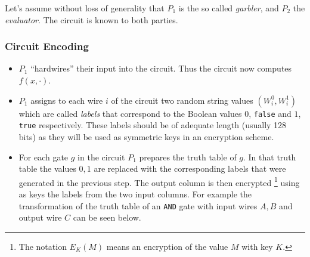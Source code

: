 Let's assume without loss of generality that $P_1$ is the so called \textit{garbler}, and $P_2$ the \textit{evaluator}. The circuit is known to both parties.

\subsubsection{Circuit Encoding}

\begin{itemize}
  \item $P_1$ ``hardwires'' their input into the circuit. Thus the circuit now computes $f(x, \cdot)$.
  \item $P_1$ assigns to each wire $i$ of the circuit two random string values $(W_i^0, W_i^1)$ which are called \textit{labels} that correspond to the Boolean values $0$, \texttt{false} and $1$, \texttt{true} respectively. These labels should be of adequate length (usually 128 bits) as they will be used as symmetric keys in an encryption scheme.
  \item For each gate $g$ in the circuit $P_1$ prepares the truth table of $g$. In that truth table the values $0,1$ are replaced with the corresponding labels that were generated in the previous step. The output column is then encrypted \footnote{The notation $E_{K}(M)$ means an encryption of the value $M$ with key $K$.} using as keys the labels from the two input columns.
  For example the transformation of the truth table of an \texttt{AND} gate with input wires $A,B$ and output wire $C$ can be seen below.


\end{itemize}
